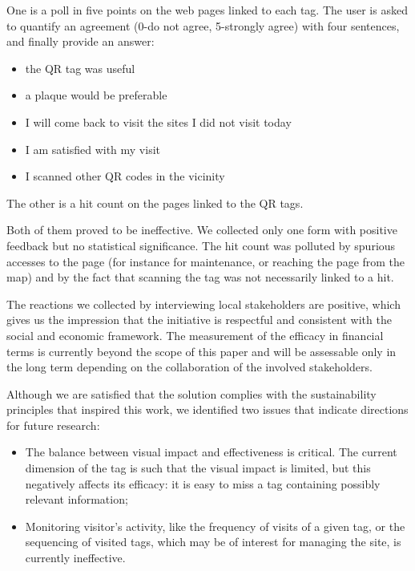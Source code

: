 \documentclass[sustainability,article,submit,pdftex,moreauthors]{Definitions/mdpi}
\begin{document}
One is a poll in five points on the web pages linked to each tag. The user is asked to quantify an agreement (0-do not agree, 5-strongly agree) with four sentences, and finally provide an answer:
\begin{itemize}
\item the QR tag was useful
\item a plaque would be preferable
\item I will come back to visit the sites I did not visit today
\item I am satisfied with my visit
\item I scanned other QR codes in the vicinity
\end{itemize}

The other is a hit count on the pages linked to the QR tags.

Both of them proved to be ineffective. We collected only one form with positive feedback but no statistical significance. The hit count was polluted by spurious accesses to the page (for instance for maintenance, or reaching the page from the map) and by the fact that scanning the tag was not necessarily linked to a hit.

The reactions we collected by interviewing local stakeholders are positive, which gives us the impression that the initiative is respectful and consistent with the social and economic framework. The measurement of the efficacy in financial terms is currently beyond the scope of this paper and will be assessable only in the long term depending on the collaboration of the involved stakeholders.

Although we are satisfied that the solution complies with the sustainability principles that inspired this work, we identified two issues that indicate directions for future research:

\begin{itemize}
    \item The balance between visual impact and effectiveness is critical. The current dimension of the tag is such that the visual impact is limited, but this negatively affects its efficacy: it is easy to miss a tag containing possibly relevant information;
    \item Monitoring visitor's activity, like the frequency of visits of a given tag, or the sequencing of visited tags, which may be of interest for managing the site, is currently ineffective.
\end{itemize}
\end{document}
